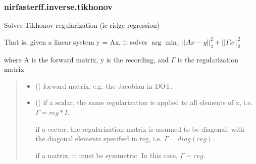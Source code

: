 \documentclass[letterpaper,10pt,english]{sphinxmanual}
\begin{document}
\sphinxstepscope


\subsubsection{nirfasterff.inverse.tikhonov}
\label{\detokenize{_autosummary/nirfasterff.inverse.tikhonov:nirfasterff-inverse-tikhonov}}\label{\detokenize{_autosummary/nirfasterff.inverse.tikhonov::doc}}

\begin{fulllineitems}
\label{\detokenize{_autosummary/nirfasterff.inverse.tikhonov:nirfasterff.inverse.tikhonov}}
\pysigstartsignatures
\pysiglinewithargsret
{}
{\sphinxparamcomma {}\sphinxparamcomma {}}
{}
\pysigstopsignatures
\sphinxAtStartPar
Solves Tikhonov regularization (ie ridge regression)

\sphinxAtStartPar
That is, given a linear system y = Ax, it solves \(\arg\min_x ||Ax-y||_2^2+||\Gamma x||_2^2\)

\sphinxAtStartPar
where A is the forward matrix, y is the recording, and \(\Gamma\) is the regularization matrix
\begin{quote}\begin{description}
\begin{itemize}
\item {} 
\sphinxAtStartPar
{} () \textendash{} forward matrix, e.g. the Jacobian in DOT.

\item {} 
\sphinxAtStartPar
{} () \textendash{} 
\sphinxAtStartPar
if a scalar, the same regularization is applied to all elements of x, i.e. \(\Gamma=reg*I\).

\sphinxAtStartPar
if a vector, the regularization matrix is assumed to be diagonal, with the diagonal elements specified in reg, i.e. \(\Gamma=diag(reg)\).

\sphinxAtStartPar
if a matrix, it must be symmetric. In this case, \(\Gamma=reg\).



\end{itemize}
\end{description}
\end{quote}
\end{fulllineitems}
\end{document}
